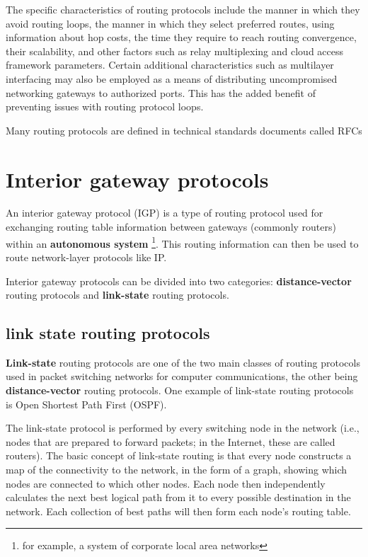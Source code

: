\documentclass[a4paper,12pt]{book}
\begin{document}
The specific characteristics of routing protocols include the manner in which they avoid routing loops, the manner in which they select preferred routes, using information about hop costs, the time they require to reach routing convergence, their scalability, and other factors such as relay multiplexing and cloud access framework parameters. Certain additional characteristics such as multilayer interfacing may also be employed as a means of distributing uncompromised networking gateways to authorized ports. This has the added benefit of preventing issues with routing protocol loops.

Many routing protocols are defined in technical standards documents called RFCs

\section{Interior gateway protocols}
An interior gateway protocol (IGP) is a type of routing protocol used for exchanging routing table information between gateways (commonly routers) within an \textbf{autonomous system} \footnote{\label{autonomous-system}for example, a system of corporate local area networks}. This routing information can then be used to route network-layer protocols like IP.

Interior gateway protocols can be divided into two categories: \textbf{distance-vector} routing protocols and \textbf{link-state} routing protocols.

\subsection{link state routing protocols}
\textbf{Link-state} routing protocols are one of the two main classes of routing protocols used in packet switching networks for computer communications, the other being \textbf{distance-vector} routing protocols. One example of link-state routing protocols is Open Shortest Path First (OSPF).%

The link-state protocol is performed by every switching node in the network (i.e., nodes that are prepared to forward packets; in the Internet, these are called routers). The basic concept of link-state routing is that every node constructs a map of the connectivity to the network, in the form of a graph, showing which nodes are connected to which other nodes. Each node then independently calculates the next best logical path from it to every possible destination in the network. Each collection of best paths will then form each node's routing table.
\end{document}
